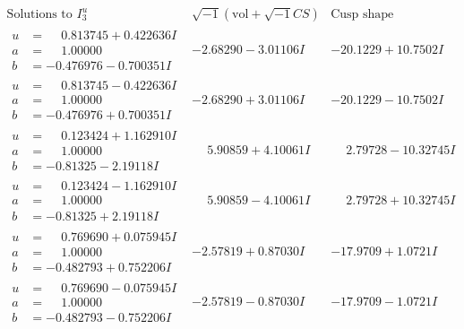 \documentclass[1p]{elsarticle_modified}
\theoremstyle{definition}
\newcommand{\I}{\sqrt{-1}}
\begin{document}
$$\begin{array}{c|c|c}  
\text{Solutions to }I^u_{3}& \I (\text{vol} + \sqrt{-1}CS) & \text{Cusp shape}\\
 \hline 
\begin{aligned}
u &= \phantom{-}0.813745 + 0.422636 I \\
a &= \phantom{-}1.00000\phantom{ +0.000000I} \\
b &= -0.476976 - 0.700351 I\end{aligned}
 & -2.68290 - 3.01106 I & -20.1229 + 10.7502 I \\ \hline\begin{aligned}
u &= \phantom{-}0.813745 - 0.422636 I \\
a &= \phantom{-}1.00000\phantom{ +0.000000I} \\
b &= -0.476976 + 0.700351 I\end{aligned}
 & -2.68290 + 3.01106 I & -20.1229 - 10.7502 I \\ \hline\begin{aligned}
u &= \phantom{-}0.123424 + 1.162910 I \\
a &= \phantom{-}1.00000\phantom{ +0.000000I} \\
b &= -0.81325 - 2.19118 I\end{aligned}
 & \phantom{-}5.90859 + 4.10061 I & \phantom{-}2.79728 - 10.32745 I \\ \hline\begin{aligned}
u &= \phantom{-}0.123424 - 1.162910 I \\
a &= \phantom{-}1.00000\phantom{ +0.000000I} \\
b &= -0.81325 + 2.19118 I\end{aligned}
 & \phantom{-}5.90859 - 4.10061 I & \phantom{-}2.79728 + 10.32745 I \\ \hline\begin{aligned}
u &= \phantom{-}0.769690 + 0.075945 I \\
a &= \phantom{-}1.00000\phantom{ +0.000000I} \\
b &= -0.482793 + 0.752206 I\end{aligned}
 & -2.57819 + 0.87030 I & -17.9709 + 1.0721 I \\ \hline\begin{aligned}
u &= \phantom{-}0.769690 - 0.075945 I \\
a &= \phantom{-}1.00000\phantom{ +0.000000I} \\
b &= -0.482793 - 0.752206 I\end{aligned}
 & -2.57819 - 0.87030 I & -17.9709 - 1.0721 I \\ \hline\begin{aligned}

\end{aligned}
\end{array}$$
\end{document}
